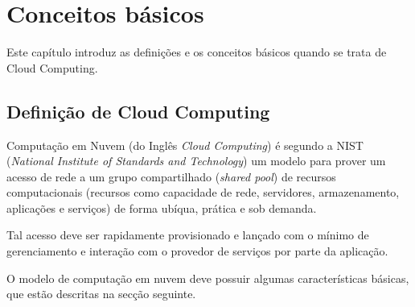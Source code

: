 \chapter{Conceitos básicos}
Este capítulo introduz as definições e os conceitos básicos quando se trata de Cloud Computing.

\section{Definição de Cloud Computing}
	Computação em Nuvem (do Inglês \textit{Cloud Computing}) é segundo a NIST (\textit{National Institute of Standards and Technology}) um modelo para prover um acesso de rede a um grupo compartilhado (\textit{shared pool}) de recursos computacionais (recursos como capacidade de rede, servidores, armazenamento, aplicações e serviços) de forma ubíqua, prática e sob demanda.

	Tal acesso deve ser rapidamente provisionado e lançado com o mínimo de gerenciamento e interação com o provedor de serviços por parte da aplicação.

	O modelo de computação em nuvem deve possuir algumas características básicas, que estão descritas na secção seguinte.

